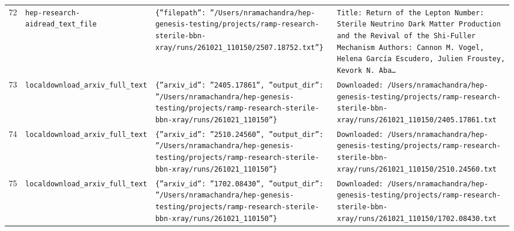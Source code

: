 \documentclass[11pt,a4paper]{article}
\begin{document}
\begin{longtable}{@{}p{}p{}p{}p{}@{}}
72 & \texttt{hep-research-aid}\newline\texttt{read\_\allowbreak{}text\_\allowbreak{}file} & \texttt{\{''filepath'':\allowbreak{} ''/\allowbreak{}Users/\allowbreak{}nramachandra/\allowbreak{}hep-genesis-testing/\allowbreak{}projects/\allowbreak{}ramp-research-sterile-bbn-xray/\allowbreak{}runs/\allowbreak{}261021\_\allowbreak{}110150/\allowbreak{}2507.18752.txt''\}\allowbreak{}} & \texttt{Title:\allowbreak{} Return of the Lepton Number:\allowbreak{} Sterile Neutrino Dark Matter Production and the Revival of the Shi-Fuller Mechanism Authors:\allowbreak{} Cannon M. Vogel,\allowbreak{} Helena García Escudero,\allowbreak{} Julien Froustey,\allowbreak{} Kevork N. Aba\ldots{}\allowbreak{}} \\
73 & \texttt{local}\newline\texttt{download\_\allowbreak{}arxiv\_\allowbreak{}full\_\allowbreak{}text} & \texttt{\{''arxiv\_\allowbreak{}id'':\allowbreak{} ''2405.17861'',\allowbreak{} ''output\_\allowbreak{}dir'':\allowbreak{} ''/\allowbreak{}Users/\allowbreak{}nramachandra/\allowbreak{}hep-genesis-testing/\allowbreak{}projects/\allowbreak{}ramp-research-sterile-bbn-xray/\allowbreak{}runs/\allowbreak{}261021\_\allowbreak{}110150''\}\allowbreak{}} & \texttt{Downloaded:\allowbreak{} /\allowbreak{}Users/\allowbreak{}nramachandra/\allowbreak{}hep-genesis-testing/\allowbreak{}projects/\allowbreak{}ramp-research-sterile-bbn-xray/\allowbreak{}runs/\allowbreak{}261021\_\allowbreak{}110150/\allowbreak{}2405.17861.txt} \\
74 & \texttt{local}\newline\texttt{download\_\allowbreak{}arxiv\_\allowbreak{}full\_\allowbreak{}text} & \texttt{\{''arxiv\_\allowbreak{}id'':\allowbreak{} ''2510.24560'',\allowbreak{} ''output\_\allowbreak{}dir'':\allowbreak{} ''/\allowbreak{}Users/\allowbreak{}nramachandra/\allowbreak{}hep-genesis-testing/\allowbreak{}projects/\allowbreak{}ramp-research-sterile-bbn-xray/\allowbreak{}runs/\allowbreak{}261021\_\allowbreak{}110150''\}\allowbreak{}} & \texttt{Downloaded:\allowbreak{} /\allowbreak{}Users/\allowbreak{}nramachandra/\allowbreak{}hep-genesis-testing/\allowbreak{}projects/\allowbreak{}ramp-research-sterile-bbn-xray/\allowbreak{}runs/\allowbreak{}261021\_\allowbreak{}110150/\allowbreak{}2510.24560.txt} \\
75 & \texttt{local}\newline\texttt{download\_\allowbreak{}arxiv\_\allowbreak{}full\_\allowbreak{}text} & \texttt{\{''arxiv\_\allowbreak{}id'':\allowbreak{} ''1702.08430'',\allowbreak{} ''output\_\allowbreak{}dir'':\allowbreak{} ''/\allowbreak{}Users/\allowbreak{}nramachandra/\allowbreak{}hep-genesis-testing/\allowbreak{}projects/\allowbreak{}ramp-research-sterile-bbn-xray/\allowbreak{}runs/\allowbreak{}261021\_\allowbreak{}110150''\}\allowbreak{}} & \texttt{Downloaded:\allowbreak{} /\allowbreak{}Users/\allowbreak{}nramachandra/\allowbreak{}hep-genesis-testing/\allowbreak{}projects/\allowbreak{}ramp-research-sterile-bbn-xray/\allowbreak{}runs/\allowbreak{}261021\_\allowbreak{}110150/\allowbreak{}1702.08430.txt} \\

\end{longtable}
\end{document}
